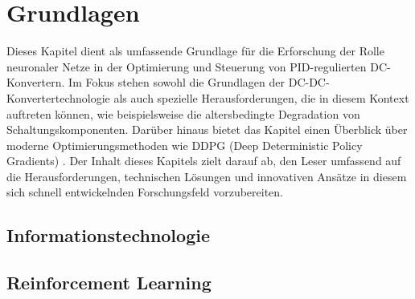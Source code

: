 \chapter{Grundlagen}

Dieses Kapitel dient als umfassende Grundlage für die Erforschung der Rolle neuronaler Netze in der Optimierung und Steuerung von PID-regulierten DC-Konvertern. Im Fokus stehen sowohl die Grundlagen der DC-DC-Konvertertechnologie als auch spezielle Herausforderungen, die in diesem Kontext auftreten können, wie beispielsweise die altersbedingte Degradation von Schaltungskomponenten. Darüber hinaus bietet das Kapitel einen Überblick über moderne Optimierungsmethoden wie DDPG (Deep Deterministic Policy Gradients) . Der Inhalt dieses Kapitels zielt darauf ab, den Leser umfassend auf die Herausforderungen, technischen Lösungen und innovativen Ansätze in diesem sich schnell entwickelnden Forschungsfeld vorzubereiten.



% 
% 
% 
% 

\section{Informationstechnologie}









\section{Reinforcement Learning}










  






